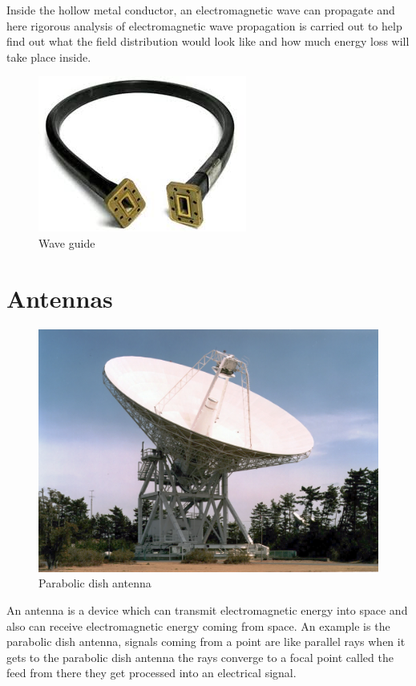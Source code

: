 Inside the hollow metal conductor, an electromagnetic wave can propagate and here rigorous analysis of electromagnetic wave propagation is carried out to help find out what the field distribution would look like and how much energy loss will take place inside.
\begin{figure}[h]
\centering
\includegraphics[scale=0.4]{./graphics/waveguide2}
\caption{Wave guide}
\end{figure}

\section{Antennas}
\begin{figure}[h]
\centering
\includegraphics[scale=0.4]{./graphics/spcaceantenna}
\caption{Parabolic dish antenna}
\end{figure}
An antenna is a device which can transmit electromagnetic energy into space and also can receive electromagnetic energy coming from space. An example is the parabolic dish antenna, signals coming from a point are like parallel rays when it gets to the parabolic dish antenna the rays converge to a focal point called the feed from there they get processed into an electrical signal.\\

